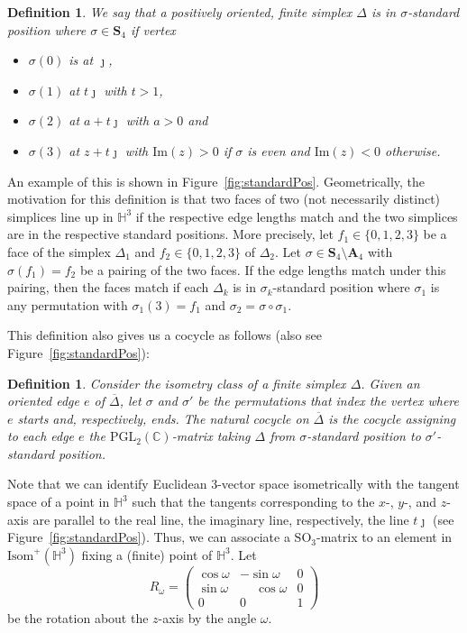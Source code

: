 \documentclass[utopia,fullpage]{nmd/article}
\newcommand\C{\mathbb C}
\renewcommand\H{\mathbb H}
\newcommand\Isom{\mathrm{Isom}}
\newtheorem{definition}[theorem]{Definition}
\newcommand\myIm{\mathrm{Im}}
\newcommand\myPGL[2]{\mathrm{PGL}_{#1}(#2)}
\newcommand\mySO[1]{\mathrm{SO}_{#1}}
\newcommand\permS{\mathbf{S}}
\newcommand\permA{\mathbf{A}}
\newcommand\myJ{\jmath}
\begin{document}
\begin{definition} \label{def:standardPosSimplex}
We say that a positively oriented, finite simplex $\Delta$ is in $\sigma$-standard position where $\sigma\in \permS_4$ if vertex
\begin{itemize}
\item $\sigma(0)$ is at $\myJ$,
\item $\sigma(1)$ at $t\myJ$ with $t>1$,
\item $\sigma(2)$ at $a+t\myJ$ with $a>0$ and
\item $\sigma(3)$ at $z+t\myJ$ with $\myIm(z)>0$ if $\sigma$ is even and $\myIm(z)<0$ otherwise.
\end{itemize}
\end{definition}
An example of this is shown in Figure~\ref{fig:standardPos}.
Geometrically, the motivation for this definition is that two faces of two (not necessarily distinct) simplices line up in $\H^3$ if the respective edge lengths match and the two simplices are in the respective standard positions. More precisely, let $f_1\in\{0,1,2,3\}$ be a face of the simplex $\Delta_1$ and $f_2\in\{0,1,2,3\}$ of $\Delta_2$. Let $\sigma\in \permS_4\setminus \permA_4$ with $\sigma(f_1)=f_2$ be a pairing of the two faces. If the edge lengths match under this pairing, then the faces match if each $\Delta_k$ is in $\sigma_k$-standard position where $\sigma_1$ is any permutation with $\sigma_1(3)=f_1$ and $\sigma_2=\sigma\circ \sigma_1$.

This definition also gives us a cocycle as follows (also see Figure~\ref{fig:standardPos}):

\begin{definition}
Consider the isometry class of a finite simplex $\Delta$. Given an oriented edge $e$ of $\overline{\Delta}$, let $\sigma$ and $\sigma'$ be the permutations that index the vertex where $e$ starts and, respectively, ends. The natural cocycle on $\overline{\Delta}$ is the cocycle assigning to each edge $e$ the $\myPGL{2}{\C}$-matrix taking $\Delta$ from $\sigma$-standard position to $\sigma'$-standard position.
\end{definition}

Note that we can identify Euclidean 3-vector space isometrically with the tangent space of a point in $\H^3$ such that the tangents corresponding to the $x$-, $y$-, and $z$-axis are parallel to the real line, the imaginary line, respectively, the line $t\myJ$ (see Figure~\ref{fig:standardPos}). Thus, we can associate a $\mySO{3}$-matrix to an element in $\Isom^+(\H^3)$ fixing a (finite) point of $\H^3$. Let
$$R_\omega = \left(\begin{array}{ccc} \cos\omega & -\sin\omega & 0 \\ \sin\omega & \phantom{-}\cos\omega &  0\\0 &0 & 1\end{array}\right)$$
be the rotation about the $z$-axis by the angle $\omega$.
\end{document}
